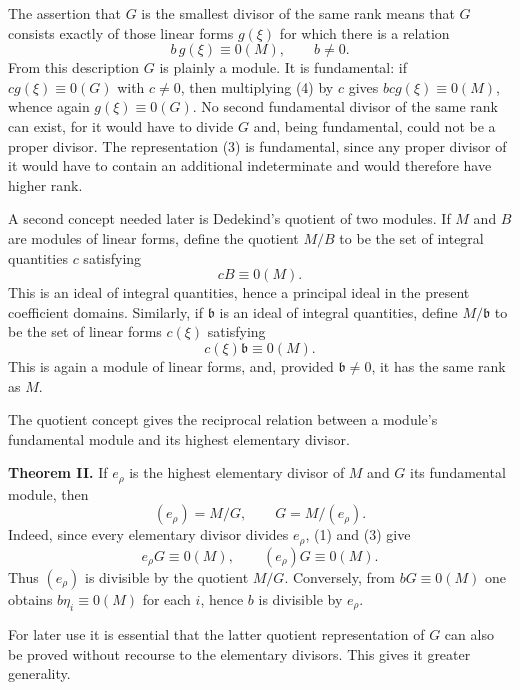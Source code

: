 \documentclass[11pt]{article}
\begin{document}
The assertion that $G$ is the smallest divisor of the same rank means that $G$ consists exactly of those linear forms $g(\xi)$ for which there is a relation
\begin{equation}
  b\,g(\xi)
  \equiv 0(M),\qquad b\ne 0.                                      \tag{4}
\end{equation}
From this description $G$ is plainly a module. It is fundamental: if $c g(\xi)\equiv0(G)$ with $c\ne0$, then multiplying (4) by $c$ gives $bcg(\xi)\equiv0(M)$, whence again $g(\xi)\equiv0(G)$. No second fundamental divisor of the same rank can exist, for it would have to divide $G$ and, being fundamental, could not be a proper divisor. The representation (3) is fundamental, since any proper divisor of it would have to contain an additional indeterminate and would therefore have higher rank.

A second concept needed later is Dedekind's quotient of two modules. If $M$ and $B$ are modules of linear forms, define the quotient $M/B$ to be the set of integral quantities $c$ satisfying
\[
  cB\equiv0(M).
\]
This is an ideal of integral quantities, hence a principal ideal in the present coefficient domains. Similarly, if $\mathfrak b$ is an ideal of integral quantities, define $M/\mathfrak b$ to be the set of linear forms $c(\xi)$ satisfying
\[
  c(\xi)\mathfrak b\equiv0(M).
\]
This is again a module of linear forms, and, provided $\mathfrak b\ne0$, it has the same rank as $M$.

The quotient concept gives the reciprocal relation between a module's fundamental module and its highest elementary divisor.

\textbf{Theorem II.} If $e_\rho$ is the highest elementary divisor of $M$ and $G$ its fundamental module, then
\begin{equation}
  (e_\rho)=M/G,
  \qquad
  G=M/(e_\rho).                                                    \tag{5}
\end{equation}
Indeed, since every elementary divisor divides $e_\rho$, (1) and (3) give
\begin{equation}
  e_\rho G\equiv0(M),
  \qquad (e_\rho)G\equiv0(M).                                     \tag{6}
\end{equation}
Thus $(e_\rho)$ is divisible by the quotient $M/G$. Conversely, from $bG\equiv0(M)$ one obtains $b\eta_i\equiv0(M)$ for each $i$, hence $b$ is divisible by $e_\rho$.

For later use it is essential that the latter quotient representation of $G$ can also be proved without recourse to the elementary divisors. This gives it greater generality.
\end{document}
